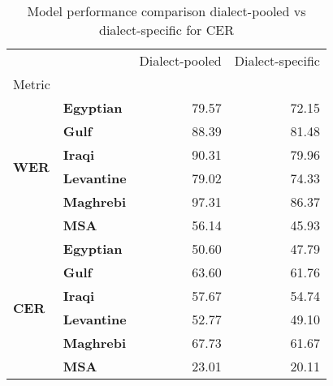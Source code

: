 \begin{table}
\caption{Model performance comparison dialect-pooled vs dialect-specific for CER}
\label{tab:ex_comparison_dialectal}
\begin{tabular}{llrr}
\toprule
 &  & Dialect-pooled & Dialect-specific \\
Metric &  &  &  \\
\midrule
\multirow[t]{6}{*}{\textbf{WER}} & \textbf{Egyptian} & 79.57 & 72.15 \\
\textbf{} & \textbf{Gulf} & 88.39 & 81.48 \\
\textbf{} & \textbf{Iraqi} & 90.31 & 79.96 \\
\textbf{} & \textbf{Levantine} & 79.02 & 74.33 \\
\textbf{} & \textbf{Maghrebi} & 97.31 & 86.37 \\
\textbf{} & \textbf{MSA} & 56.14 & 45.93 \\
\cline{1-4}
\multirow[t]{6}{*}{\textbf{CER}} & \textbf{Egyptian} & 50.60 & 47.79 \\
\textbf{} & \textbf{Gulf} & 63.60 & 61.76 \\
\textbf{} & \textbf{Iraqi} & 57.67 & 54.74 \\
\textbf{} & \textbf{Levantine} & 52.77 & 49.10 \\
\textbf{} & \textbf{Maghrebi} & 67.73 & 61.67 \\
\textbf{} & \textbf{MSA} & 23.01 & 20.11 \\
\cline{1-4}
\bottomrule
\end{tabular}
\end{table}
